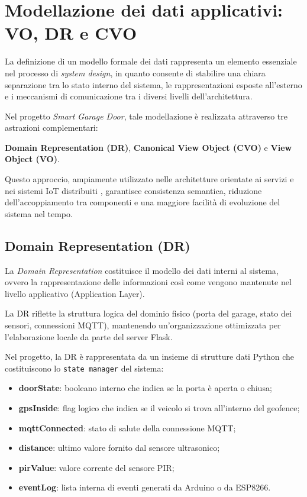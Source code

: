 \section{Modellazione dei dati applicativi: VO, DR e CVO}


La definizione di un modello formale dei dati rappresenta un elemento essenziale nel processo di \textit{system design}, in quanto consente di stabilire una chiara separazione tra lo stato interno del sistema, le rappresentazioni esposte all’esterno e i meccanismi di comunicazione tra i diversi livelli dell’architettura.

Nel progetto \textit{Smart Garage Door}, tale modellazione è realizzata attraverso tre astrazioni complementari:

\textbf{Domain Representation (DR)}, \textbf{Canonical View Object (CVO)} e \textbf{View Object (VO)}.


Questo approccio, ampiamente utilizzato nelle architetture orientate ai servizi e nei sistemi IoT distribuiti \cite{Guinard2016, Gubbi2013}, garantisce consistenza semantica, riduzione dell’accoppiamento tra componenti e una maggiore facilità di evoluzione del sistema nel tempo.


\subsection{Domain Representation (DR)}


La \textit{Domain Representation} costituisce il modello dei dati interni al sistema, ovvero la rappresentazione delle informazioni così come vengono mantenute nel livello applicativo (Application Layer).

La DR riflette la struttura logica del dominio fisico (porta del garage, stato dei sensori, connessioni MQTT), mantenendo un’organizzazione ottimizzata per l’elaborazione locale da parte del server Flask.


Nel progetto, la DR è rappresentata da un insieme di strutture dati Python che costituiscono lo \texttt{state manager} del sistema:


\begin{itemize}

\item \textbf{doorState}: booleano interno che indica se la porta è aperta o chiusa;

\item \textbf{gpsInside}: flag logico che indica se il veicolo si trova all’interno del geofence;

\item \textbf{mqttConnected}: stato di salute della connessione MQTT;

\item \textbf{distance}: ultimo valore fornito dal sensore ultrasonico;

\item \textbf{pirValue}: valore corrente del sensore PIR;

\item \textbf{eventLog}: lista interna di eventi generati da Arduino o da ESP8266.

\end{itemize}


